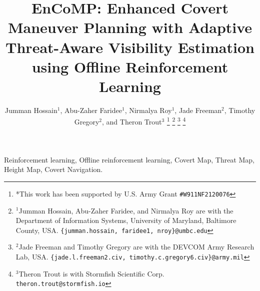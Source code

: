 \documentclass[10pt, conference, compsocconf, letterpaper]{IEEEtran}
\begin{document}

\newcommand{\done}{\cellcolor{teal}done} 



\title{\text EnCoMP: Enhanced Covert Maneuver Planning with Adaptive Threat-Aware Visibility Estimation using Offline Reinforcement Learning}



\author{Jumman Hossain$^{1}$, Abu-Zaher Faridee$^{1}$, Nirmalya Roy$^{1}$, Jade Freeman$^{2}$, Timothy Gregory$^{2}$, and Theron Trout$^{3}$%
\thanks{*This work has been supported by U.S. Army Grant \texttt{\#W911NF2120076}}%
\thanks{$^{1}$Jumman Hossain, Abu-Zaher Faridee, and Nirmalya Roy are with the Department of Information Systems, University of Maryland, Baltimore County, USA. {\tt\small \{jumman.hossain, faridee1, nroy\}@umbc.edu}}%
\thanks{$^{2}$Jade Freeman and Timothy Gregory are with the DEVCOM Army Research Lab, USA. {\tt\small \{jade.l.freeman2.civ, timothy.c.gregory6.civ\}@army.mil}}%
\thanks{$^{3}$Theron Trout is with Stormfish Scientific Corp. {\tt\small theron.trout@stormfish.io}}%
}

\maketitle

\begin{IEEEkeywords}
Reinforcement learning, Offline reinforcement learning,
Covert Map, Threat Map, Height Map, Covert Navigation.
\end{IEEEkeywords}






%



\end{document}
